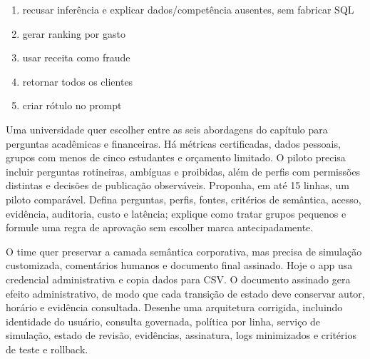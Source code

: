 \begin{enumerate}[label=\Alph*)]

\item recusar inferência e explicar dados/competência ausentes, sem fabricar SQL

\item gerar ranking por gasto

\item usar receita como fraude

\item retornar todos os clientes

\item criar rótulo no prompt

\end{enumerate}

\TextoBase
Uma universidade quer escolher entre as seis abordagens do capítulo para perguntas acadêmicas e financeiras. Há métricas certificadas, dados pessoais, grupos com menos de cinco estudantes e orçamento limitado.
O piloto precisa incluir perguntas rotineiras, ambíguas e proibidas, além de perfis com permissões distintas e decisões de publicação observáveis.
\FonteDidatica
\Comando Proponha, em até 15 linhas, um piloto comparável. Defina perguntas, perfis, fontes, critérios de semântica, acesso, evidência, auditoria, custo e latência; explique como tratar grupos pequenos e formule uma regra de aprovação sem escolher marca antecipadamente.

\TextoBase
O time quer preservar a camada semântica corporativa, mas precisa de simulação customizada, comentários humanos e documento final assinado. Hoje o app usa credencial administrativa e copia dados para CSV.
O documento assinado gera efeito administrativo, de modo que cada transição de estado deve conservar autor, horário e evidência consultada.
\FonteDidatica
\Comando Desenhe uma arquitetura corrigida, incluindo identidade do usuário, consulta governada, política por linha, serviço de simulação, estado de revisão, evidências, assinatura, logs minimizados e critérios de teste e rollback.

